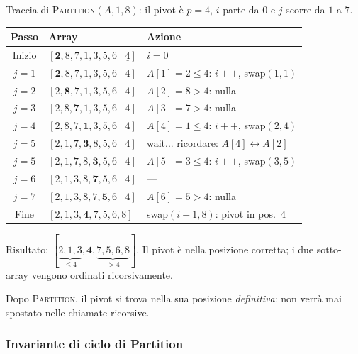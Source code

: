 \begin{esempio}[{Partition su $A=[2,8,7,1,3,5,6,4]$, pivot $= A[8]=4$}]
	Traccia di \textsc{Partition}$(A, 1, 8)$: il pivot è $p = 4$,
	$i$ parte da $0$ e $j$ scorre da $1$ a $7$.
	
	\begin{center}
		\renewcommand{\arraystretch}{1.3}
		\begin{tabular}{c l l}
			\toprule
			\textbf{Passo} & \textbf{Array} & \textbf{Azione} \\
			\midrule
			Inizio & $[\mathbf{2}, 8, 7, 1, 3, 5, 6\mid \underline{4}]$ & $i=0$ \\
			$j=1$  & $[\mathbf{2}, 8, 7, 1, 3, 5, 6\mid 4]$ & $A[1]=2\le 4$: $i{+}{+}$, swap$(1,1)$ \\
			$j=2$  & $[2, \mathbf{8}, 7, 1, 3, 5, 6\mid 4]$ & $A[2]=8>4$: nulla \\
			$j=3$  & $[2, 8, \mathbf{7}, 1, 3, 5, 6\mid 4]$ & $A[3]=7>4$: nulla \\
			$j=4$  & $[2, 8, 7, \mathbf{1}, 3, 5, 6\mid 4]$ & $A[4]=1\le 4$: $i{+}{+}$, swap$(2,4)$ \\
			$j=5$  & $[2, 1, 7, \mathbf{3}, 8, 5, 6\mid 4]$ & wait... ricordare: $A[4]\leftrightarrow A[2]$ \\
			$j=5$  & $[2, 1, 7, 8, \mathbf{3}, 5, 6\mid 4]$ & $A[5]=3\le 4$: $i{+}{+}$, swap$(3,5)$ \\
			$j=6$  & $[2, 1, 3, 8, \mathbf{7}, 5, 6\mid 4]$ & — \\
			$j=7$  & $[2, 1, 3, 8, 7, \mathbf{5}, 6\mid 4]$ & $A[6]=5>4$: nulla \\
			Fine    & $[2, 1, 3, \mathbf{4}, 7, 5, 6, 8]$   & swap$(i{+}1, 8)$: pivot in pos.\ 4 \\
			\bottomrule
		\end{tabular}
	\end{center}
	
	Risultato: $[\underbrace{2,1,3}_{\le 4}, \mathbf{4}, \underbrace{7,5,6,8}_{>4}]$.
	Il pivot è nella posizione corretta; i due sotto-array vengono ordinati
	ricorsivamente.
\end{esempio}

\begin{hardnote}
	Dopo \textsc{Partition}, il pivot si trova nella sua posizione
	\emph{definitiva}: non verrà mai spostato nelle chiamate ricorsive.
\end{hardnote}

\subsubsection{Invariante di ciclo di Partition}

